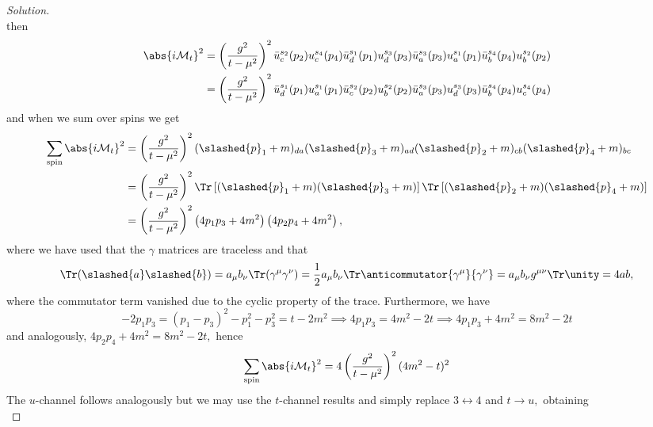\begin{proof}[Solution]
\begin{equation*}
   \end{equation*}
   then
   \begin{align*}
       \abs{i \mathcal{M}_t}^2 &= \left(\frac{g^2}{t - \mu^2}\right)^2\bar{u}_c^{s_2}(p_2) u_c^{s_4}(p_4) \bar{u}_d^{s_1}(p_1) u_d^{s_3}(p_3)\bar{u}_a^{s_3}(p_3) u_a^{s_1}(p_1) \bar{u}_b^{s_4}(p_4)u_b^{s_2}(p_2)\\
                               &=\left(\frac{g^2}{t - \mu^2}\right)^2 \bar{u}_d^{s_1}(p_1)u_a^{s_1}(p_1) \bar{u}_c^{s_2}(p_2) u_b^{s_2}(p_2) \bar{u}^{s_3}_a(p_3) u_d^{s_3}(p_3) \bar{u}_b^{s_4}(p_4) u_c^{s_4}(p_4)
   \end{align*}
   and when we sum over spins we get
   \begin{align*}
       \sum_{\mathrm{spin}}{\abs{i \mathcal{M}_t}^2}&= \left(\frac{g^2}{t - \mu^2}\right)^2 (\slashed{p}_1 + m)_{da} (\slashed{p}_3 + m)_{ad} (\slashed{p}_2 + m)_{cb} (\slashed{p}_4 + m)_{bc}\\
                                                   &= \left(\frac{g^2}{t - \mu^2}\right)^2 \Tr\left[(\slashed{p}_1 + m)(\slashed{p}_3 + m)\right] \Tr\left[(\slashed{p}_2 + m)(\slashed{p}_4 + m)\right]\\
                                                   &= \left(\frac{g^2}{t - \mu^2}\right)^2 \left(4p_1 p_3 + 4m^2\right)\left(4p_2 p_4 + 4m^2\right),
   \end{align*}
   where we have used that the \(\gamma\) matrices are traceless and that
   \begin{equation*}
       \Tr(\slashed{a} \slashed{b}) = a_\mu b_\nu\Tr(\gamma^\mu \gamma^\nu) = \frac12 a_\mu b_\nu\Tr\anticommutator{\gamma^\mu}{\gamma^\nu} = a_\mu b_\nu g^{\mu\nu}\Tr\unity = 4 ab,
   \end{equation*}
   where the commutator term vanished due to the cyclic property of the trace. Furthermore, we have
   \begin{equation*}
       -2p_1 p_3 = (p_1 - p_3)^2 - p_1^2 - p_3^2 = t - 2m^2 \implies 4p_1 p_3 = 4m^2 - 2t \implies 4p_1 p_3 + 4m^2 = 8m^2 - 2t
   \end{equation*}
   and analogously, \(4p_2 p_4 + 4m^2 = 8m^2 - 2t,\) hence
   \begin{equation*}
       \sum_{\mathrm{spin}}{\abs{i\mathcal{M}_t}^2} = 4\left(\frac{g^2}{t - \mu^2}\right)^2 (4m^2 - t)^2
   \end{equation*}
   The \(u\)-channel follows analogously but we may use the \(t\)-channel results and simply replace \(3 \leftrightarrow 4\) and \(t \to u,\) obtaining
   \begin{equation*}

\end{equation*}
\end{proof}

